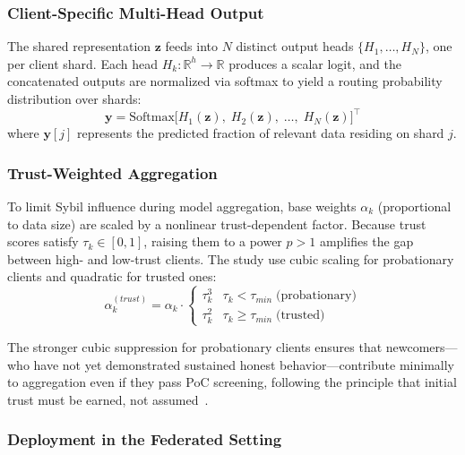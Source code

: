 \documentclass[conference]{IEEEtran}
\begin{document}
\subsubsection{Client-Specific Multi-Head Output}

The shared representation $\mathbf{z}$ feeds into $N$ distinct output heads $\{H_1, \ldots, H_N\}$, one per client shard. Each head $H_k: \mathbb{R}^h \rightarrow \mathbb{R}$ produces a scalar logit, and the concatenated outputs are normalized via softmax to yield a routing probability distribution over shards:
\begin{equation}
\mathbf{y} = \text{Softmax}\big[H_1(\mathbf{z}),\; H_2(\mathbf{z}),\; \ldots,\; H_N(\mathbf{z})\big]^\top
\label{eq:heads}
\end{equation}
where $\mathbf{y}[j]$ represents the predicted fraction of relevant data residing on shard $j$.

\subsubsection{Trust-Weighted Aggregation}

To limit Sybil influence during model aggregation, base weights $\alpha_k$ (proportional to data size) are scaled by a nonlinear trust-dependent factor. Because trust scores satisfy $\tau_k \in [0, 1]$, raising them to a power $p > 1$ amplifies the gap between high- and low-trust clients. The study use cubic scaling for probationary clients and quadratic for trusted ones:
\begin{equation}
\alpha_k^{(trust)} = \alpha_k \cdot 
\begin{cases}
\tau_k^3 & \tau_k < \tau_{min} \;\text{(probationary)} \\
\tau_k^2 & \tau_k \geq \tau_{min} \;\text{(trusted)}
\end{cases}
\label{eq:agg}
\end{equation}

The stronger cubic suppression for probationary clients ensures that newcomers---who have not yet demonstrated sustained honest behavior---contribute minimally to aggregation even if they pass PoC screening, following the principle that initial trust must be earned, not assumed~\cite{cao2021fltrust}.

\subsubsection{Deployment in the Federated Setting}
\end{document}
